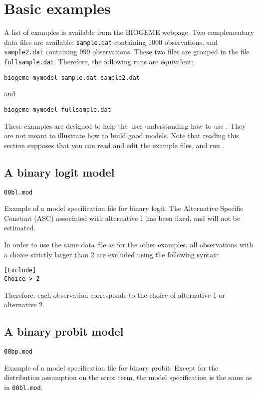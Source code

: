 \documentclass[12pt]{memoir}
\begin{document}
\section{Basic examples}
\label{sec:examples}
A list of examples is available from the BIOGEME webpage. 
Two complementary data files are available: \verb+sample.dat+ containing 1000
observations, and \verb+sample2.dat+ containing 999 observations. These two files are grouped in the file \verb+fullsample.dat+.  Therefore, the following runs are equivalent:
\begin{center}
\verb+biogeme mymodel sample.dat sample2.dat+
\end{center}
and
\begin{center}
\verb+biogeme mymodel fullsample.dat+
\end{center}
These examples are designed to help the user understanding how to use
\BIOGEME. They are not meant to illustrate how to build good
models. Note that reading this section supposes that you can read and
edit the example files, and run \BIOGEME.

\subsection{A binary logit model}
\begin{flushright}
\verb+00bl.mod+
\end{flushright}

Example of a model specification file for binary logit. The
Alternative Specific Constant (ASC) associated with alternative 1 has
been fixed, and will not be estimated.

In order to use the same data file as for the other examples, all observations with a choice strictly larger than 2 are excluded using the following syntax:
{\footnotesize
\begin{verbatim}
[Exclude]
Choice > 2
\end{verbatim}
}
Therefore, each observation corresponds to the choice of alternative 1 or alternative 2.

\subsection{A binary probit model}
\begin{flushright}
\verb+00bp.mod+
\end{flushright}

Example of a model specification file for binary probit. Except for the distribution assumption on the error term, the model specification is the same as in \verb+00bl.mod+.
\end{document}
